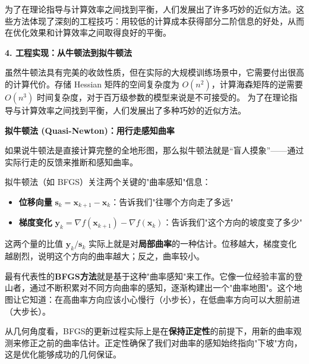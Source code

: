 
为了在理论指导与计算效率之间找到平衡，人们发展出了许多巧妙的近似方法。这些方法体现了深刻的工程技巧：用较低的计算成本获得部分二阶信息的好处，从而在优化效果和计算效率之间取得良好的平衡。

\textbf{4. 工程实现：从牛顿法到拟牛顿法}

虽然牛顿法具有完美的收敛性质，但在实际的大规模训练场景中，它需要付出很高的计算代价。存储 Hessian 矩阵的空间复杂度为 $O(n^2)$，计算海森矩阵的逆需要 $O(n^3)$ 时间复杂度，对于百万级参数的模型来说是不可接受的。
为了在理论指导与计算效率之间找到平衡，人们发展出了多种巧妙的近似方法。

\textbf{拟牛顿法 (Quasi-Newton)：用行走感知曲率}

如果说牛顿法是直接计算完整的全地形图，那么拟牛顿法就是“盲人摸象”——通过实际行走的反馈来推断和感知曲率。

拟牛顿法（如 BFGS）关注两个关键的"曲率感知"信息：
\begin{itemize}
\item \textbf{位移向量 }$\mathbf{s}_k = \mathbf{x}_{k+1} - \mathbf{x}_k$：告诉我们"往哪个方向走了多远"
\item \textbf{梯度变化 }$\mathbf{y}_k = \nabla f(\mathbf{x}_{k+1}) - \nabla f(\mathbf{x}_k)$：告诉我们"这个方向的坡度变了多少"
\end{itemize}
这两个量的比值 $\mathbf{y}_k/\mathbf{s}_k$ 
实际上就是对\textbf{局部曲率}的一种估计。位移越大，梯度变化越剧烈，说明这个方向的曲率越大；反之，曲率较小。

最有代表性的\textbf{BFGS方法}就是基于这种"曲率感知"来工作。它像一位经验丰富的登山者，通过不断积累对不同方向曲率的感知，逐渐构建出一个"曲率地图"。这个地图让它知道：在高曲率方向应该小心慢行（小步长），在低曲率方向可以大胆前进（大步长）。

从几何角度看，BFGS的更新过程实际上是在\textbf{保持正定性}的前提下，用新的曲率观测来修正之前的曲率估计。正定性确保了我们对曲率的感知始终指向"下坡"方向，这是优化能够成功的几何保证。

